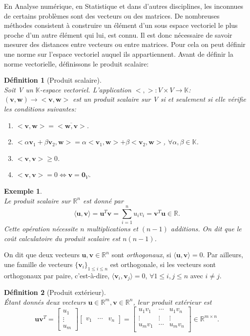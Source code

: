 \documentclass[11pt,a4paper,oneside]{book}
\newtheorem{defi}{Définition}[chapter]
\newtheorem{ex}{Exemple}[chapter]}
\def\R{\mathbb R}
\def\K{\mathbb K}
\def\v{\mathbf v}
\def\u{\mathbf u}
\def\w{\mathbf w}
\newcommand{\mbf}[1]{\mathbf{#1}}
\begin{document}
En Analyse numérique, en Statistique et dans d’autres disciplines, les inconnues de
certains problèmes sont des vecteurs ou des matrices. De nombreuses méthodes consistent
à construire un élément d’un sous espace vectoriel le plus proche d’un autre élément
qui lui, est connu. Il est donc nécessaire de savoir mesurer des distances entre vecteurs
ou entre matrices. Pour cela on peut définir une norme sur l’espace vectoriel auquel ils
appartiennent. Avant de définir la norme vectorielle, définissons le produit scalaire:
\begin{defi}[Produit scalaire]
	\emph{\\}
	Soit V un $ \K $-espace vectoriel. L'application $ <,>:V\times V\rightarrow\K $: $ (\v,\w)\rightarrow<\v,\w> $ est un produit scalaire  sur V si et seulement si elle vérifie les conditions suivantes:
	\begin{enumerate}
		\item[$ (1) $]$ <\v,\w>=\overline{<\w,\v>} $.
		\item[$ (2) $]$ <\alpha\v_{1}+\beta\v_{2},\w>=\alpha<\v_{1},\w>+\beta<\v_{2},\w> $, $ \forall \alpha,\beta\in\K $.
		\item[$ (2) $] $ <\v,\v>\geq 0 $.
		\item[$ (4) $]$ <\v,\v>=0\Leftrightarrow \v=\mbf{0}_{V} $.
	\end{enumerate}
\end{defi}
\begin{ex}\emph{\\}
	Le produit scalaire sur $ \R^{n} $ est donné par  
	\begin{equation}\label{scalar}
	\langle\u,\v\rangle=\u^{T}\v=\sum_{i=1}^{n}u_{i}v_{i}=\v^{T}\u\in\R.
	\end{equation}
Cette opération nécessite $ n $ multiplications et $ (n - 1) $ additions. On dit que le coût calculatoire du produit scalaire  est $n(n-1) $.
\end{ex}On dit que deux vecteurs $ \u,\v\in\R^{n} $ sont \textit{orthogonaux}, si $ \langle \u,\v\rangle=0 $. Par ailleurs, une famille de vecteurs $ \{\v_{i}\}_{1\leq i\leq n} $ est orthogonale, si les vecteurs sont orthogonaux par paire, c'est-à-dire, $ \langle \v_{i},\v_{j}\rangle=0 $, $ \forall1\leq  i,j\leq n $ avec $ i\neq j $.
\begin{defi}[Produit extérieur]
	\emph{\\}
	Étant donnés  deux vecteurs $ \u\in\R^{m},\v\in\R^{n} $, leur produit extérieur est
	\begin{equation}\label{produitexterieur}
	\u\v^{T}=\begin{bmatrix}
	u_{1}\\\vdots\\ u_{m}
	\end{bmatrix}\begin{bmatrix}
	v_{1}&\cdots&v_{n}
	\end{bmatrix}=\begin{bmatrix}
	u_{1}v_{1}&\cdots&u_{1}v_{n}\\
	\vdots&\vdots&\vdots\\
	u_{m}v_{1}&\cdots&u_{m}v_{n}\\
	\end{bmatrix}\in\R^{m\times n}.
	\end{equation}
\end{defi}
\end{document}
